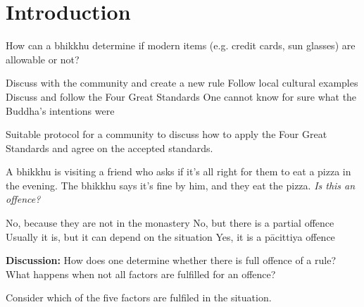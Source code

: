 \chapter{Introduction}
\renewcommand*{\theChapterTitle}{Introduction}

\begin{exam}{\autoExamName}

\begin{problem}

  How can a bhikkhu determine if modern items (e.g. credit cards, sun glasses) are allowable or not?

  \bigskip

  \begin{answers}{1}
    \bChoices
     Discuss with the community and create a new rule\eAns
     Follow local cultural examples\eAns
     Discuss and follow the Four Great Standards\eAns
     One cannot know for sure what the Buddha's intentions were\eAns
    \eChoices
  \end{answers}

  \begin{solution}
    Suitable protocol for a community to discuss how to apply the Four Great
    Standards and agree on the accepted standards.
  \end{solution}

\end{problem}

\problemDivide

\begin{problem}

  A bhikkhu is visiting a friend who asks if it's all right for them to eat a
  pizza in the evening. The bhikkhu says it's fine by him, and they eat the pizza.
  \emph{Is this an offence?}

  \bigskip

  \begin{answers}{1}
    \bChoices
     No, because they are not in the monastery\eAns
     No, but there is a partial offence\eAns
     Usually it is, but it can depend on the situation\eAns
     Yes, it is a pācittiya offence\eAns
    \eChoices
  \end{answers}

  \bigskip

  \textbf{Discussion:} How does one determine whether there is full offence of a
  rule? What happens when not all factors are fulfilled for an offence?

  \begin{solution}
    Consider which of the five factors are fulfiled in the situation.
  \end{solution}


\end{problem}
\end{exam}
